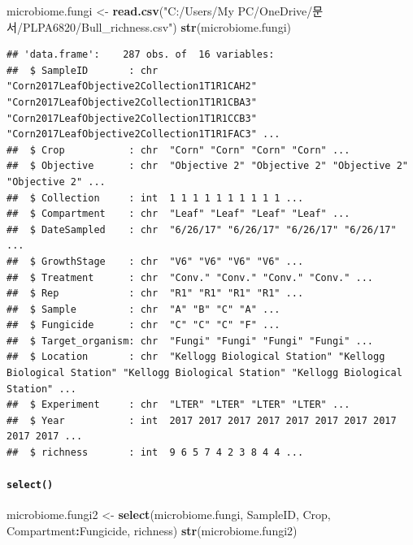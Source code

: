 \documentclass[
]{article}
\newenvironment{Shaded}{\begin{snugshade}}{\end{snugshade}}
\newcommand{\FunctionTok}[1]{\textcolor[rgb]{0.13,0.29,0.53}{\textbf{#1}}}
\newcommand{\NormalTok}[1]{#1}
\newcommand{\OtherTok}[1]{\textcolor[rgb]{0.56,0.35,0.01}{#1}}
\newcommand{\SpecialCharTok}[1]{\textcolor[rgb]{0.81,0.36,0.00}{\textbf{#1}}}
\newcommand{\StringTok}[1]{\textcolor[rgb]{0.31,0.60,0.02}{#1}}
\begin{document}
\begin{Shaded}
\begin{Highlighting}[]
\NormalTok{microbiome.fungi }\OtherTok{\textless{}{-}} \FunctionTok{read.csv}\NormalTok{(}\StringTok{"C:/Users/My PC/OneDrive/문서/PLPA6820/Bull\_richness.csv"}\NormalTok{)}
\FunctionTok{str}\NormalTok{(microbiome.fungi)}
\end{Highlighting}
\end{Shaded}

\begin{verbatim}
## 'data.frame':    287 obs. of  16 variables:
##  $ SampleID       : chr  "Corn2017LeafObjective2Collection1T1R1CAH2" "Corn2017LeafObjective2Collection1T1R1CBA3" "Corn2017LeafObjective2Collection1T1R1CCB3" "Corn2017LeafObjective2Collection1T1R1FAC3" ...
##  $ Crop           : chr  "Corn" "Corn" "Corn" "Corn" ...
##  $ Objective      : chr  "Objective 2" "Objective 2" "Objective 2" "Objective 2" ...
##  $ Collection     : int  1 1 1 1 1 1 1 1 1 1 ...
##  $ Compartment    : chr  "Leaf" "Leaf" "Leaf" "Leaf" ...
##  $ DateSampled    : chr  "6/26/17" "6/26/17" "6/26/17" "6/26/17" ...
##  $ GrowthStage    : chr  "V6" "V6" "V6" "V6" ...
##  $ Treatment      : chr  "Conv." "Conv." "Conv." "Conv." ...
##  $ Rep            : chr  "R1" "R1" "R1" "R1" ...
##  $ Sample         : chr  "A" "B" "C" "A" ...
##  $ Fungicide      : chr  "C" "C" "C" "F" ...
##  $ Target_organism: chr  "Fungi" "Fungi" "Fungi" "Fungi" ...
##  $ Location       : chr  "Kellogg Biological Station" "Kellogg Biological Station" "Kellogg Biological Station" "Kellogg Biological Station" ...
##  $ Experiment     : chr  "LTER" "LTER" "LTER" "LTER" ...
##  $ Year           : int  2017 2017 2017 2017 2017 2017 2017 2017 2017 2017 ...
##  $ richness       : int  9 6 5 7 4 2 3 8 4 4 ...
\end{verbatim}

\paragraph{\texorpdfstring{\texttt{select()}}{select()}}\label{select}

\begin{Shaded}
\begin{Highlighting}[]
\NormalTok{microbiome.fungi2 }\OtherTok{\textless{}{-}} \FunctionTok{select}\NormalTok{(microbiome.fungi, SampleID, Crop, Compartment}\SpecialCharTok{:}\NormalTok{Fungicide, richness)}
\FunctionTok{str}\NormalTok{(microbiome.fungi2)}
\end{Highlighting}
\end{Shaded}
\end{document}
